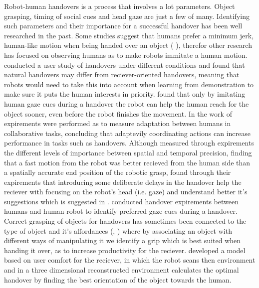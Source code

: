 Robot-human handovers is a process that involves a lot parameters. Object grasping, timing of social cues and head gaze are just a few of many. Identifying such parameters and their importance for a successful handover has been well researched in the past. Some studies suggest that humans prefer a minimum jerk, human-like motion when being handed over an object (\parencite{Huber2008} \parencite{Huber2008a}), therefor other research has focused on observing humans as to make robots immitate a human motion. \textcite{Chan2015} conducted a user study of handovers under different conditions and found that natural handovers may differ from reciever-oriented handovers, meaning that robots would need to take this into account when learning from demonstration to make sure it puts the human interests in priority. \textcite{Moon2014} found that only by imitating human gaze cues during a handover the robot can help the human reach for the object sooner, even before the robot finishes the movement. In the work of \textcite{Huang2015} expirements were performed as to measure adaptation between humans in collaborative tasks, concluding that adaptevily coordinating actions can increase performance in tasks such as handovers. Although \textcite{Koene2014} measured through expirements the different levels of importance between spatial and temporal precision, finding that a fast motion from the robot was better recieved from the human side than a spatially accurate end position of the robotic grasp, \textcite{Admoni2014} found through their expirements that introducing some deliberate delays in the handover help the reciever with focusing on the robot's head (i.e. gaze) and understand better it's suggestions which is suggested in \parencite{Moon2014}. \textcite{Gharbi2015} conducted handover expirements between humans and human-robot to identify preferred gaze cues during a handover. Correct grasping of objects for handovers has sometimes been connected to the type of object and it's affordances (\parencite{Song2015}, \parencite{Chan2014}) where by associating an object with different ways of manipulating it we identify a grip which is best suited when handing it over, as to increase productivity for the reciever. \textcite{Aleotti2012} developed a model based on user comfort for the reciever, in which the robot scans then environment and in a three dimensional reconstructed environment calculates the optimal handover by finding the best orientation of the object towards the human.

